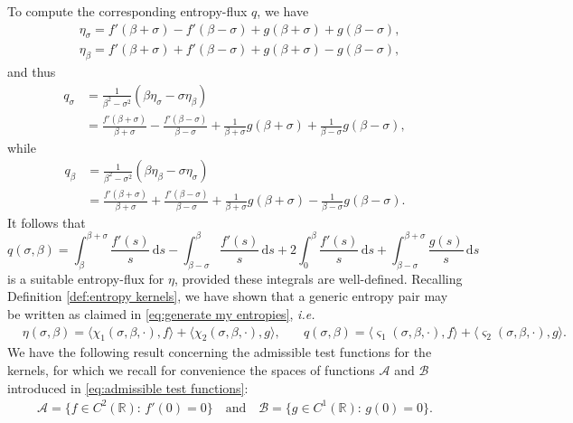 \documentclass[11pt,a4paper,reqno]{amsart}
\numberwithin{equation}{section}
\theoremstyle{definition}
\theoremstyle{remark}
\renewcommand{\d}{\, \mathrm{d}}
\begin{document}
{To compute the corresponding entropy-flux $q$, we have 
\begin{equation*}
    \begin{aligned} 
    &\eta_\sigma = f'(\beta+\sigma) - f'(\beta-\sigma) + g(\beta+\sigma) + g(\beta-\sigma), \\ 
    & \eta_\beta = f'(\beta+\sigma) + f'(\beta-\sigma) + g(\beta+\sigma) - g(\beta-\sigma), 
    \end{aligned}
\end{equation*}
and thus 
\begin{equation*}
   \begin{aligned} 
   q_\sigma &= \frac{1}{\beta^2-\sigma^2}( \beta \eta_\sigma - \sigma \eta_\beta ) \\ 
   &= \frac{f'(\beta+\sigma)}{\beta+\sigma} - \frac{f'(\beta-\sigma)}{\beta-\sigma} + \frac{1}{\beta+\sigma}g(\beta+\sigma) + \frac{1}{\beta-\sigma}g(\beta-\sigma),
   \end{aligned}
\end{equation*}
while 
\begin{equation*}
    \begin{aligned}
        q_\beta &= \frac{1}{\beta^2-\sigma^2}(\beta \eta_\beta - \sigma \eta_\sigma) \\ 
        &= \frac{f'(\beta+\sigma)}{\beta+\sigma} + \frac{f'(\beta-\sigma)}{\beta-\sigma} + \frac{1}{\beta+\sigma}g(\beta+\sigma) - \frac{1}{\beta-\sigma}g(\beta-\sigma).
    \end{aligned}
\end{equation*}
It follows that 
\begin{equation}\label{eq:q general form}
    q(\sigma,\beta) = \int_{\beta}^{\beta+\sigma} \frac{f'(s)}{s} \d s -  \int_{\beta-\sigma}^{\beta} \frac{f'(s)}{s} \d s + 2 \int_{0}^\beta \frac{f'(s)}{s} \d s + \int_{\beta-\sigma}^{\beta+\sigma} \frac{g(s)}{s} \d s 
\end{equation}
is a suitable entropy-flux for $\eta$, provided these integrals are well-defined. Recalling Definition \ref{def:entropy kernels}, we have shown that a generic entropy pair may be written as claimed in \eqref{eq:generate my entropies}, \textit{i.e.} 
\begin{align}
 &\eta(\sigma,\beta) = \langle\chi_1(\sigma,\beta,\cdot),f\rangle + \langle\chi_2(\sigma,\beta,\cdot),g\rangle, \quad 
 &q(\sigma,\beta) = \langle\varsigma_1(\sigma,\beta,\cdot),f\rangle + \langle\varsigma_2(\sigma,\beta,\cdot),g\rangle. \label{eq:kernel exp ent pair}
\end{align}
%
We have the following result concerning the admissible test functions for the kernels, for which we recall for convenience the spaces of functions $\mathcal{A}$ and $\mathcal{B}$ introduced in \eqref{eq:admissible test functions}: 
\begin{align}
\mathcal{A} = \big\{ f \in C^2(\mathbb{R}): \, f'(0) = 0 \big\} \quad \text{and} \quad \mathcal{B} = \big\{ g \in C^1(\mathbb{R}): \, g(0) = 0 \big\}. \nonumber
    \end{align}
    

}
\end{document}

